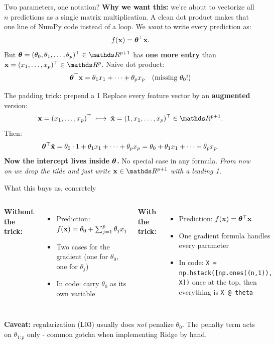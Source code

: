 \documentclass[aspectratio=169]{beamer}
\begin{document}
\begin{frame}{Two parameters, one notation?}
  \textbf{Why we want this:} we're about to vectorize all $n$ predictions as a single matrix multiplication. A clean dot product makes that one line of NumPy code instead of a loop.
  \vfill
  We \emph{want} to write every prediction as:
  \[
    f(\mathbf{x}) = \bm{\theta}^\top \mathbf{x}.
  \]
  But $\thetav = (\theta_0, \theta_1, \dots, \theta_p)^\top \in \R^{p+1}$ has \textbf{one more entry} than $\xv = (x_1, \dots, x_p)^\top \in \R^p$.
  \vfill
  Naive dot product:
  \[
    \bm{\theta}^\top \mathbf{x} = \theta_1 x_1 + \dots + \theta_p x_p \quad \text{(missing $\theta_0$!)}
  \]
\end{frame}

\begin{frame}{The padding trick: prepend a 1}
  Replace every feature vector by an \textbf{augmented} version:
  \[
    \xv = (x_1, \dots, x_p)^\top
    \;\longmapsto\;
    \tilde{\xv} = (1, x_1, \dots, x_p)^\top \in \R^{p+1}.
  \]
  Then:
  \[
    \bm{\theta}^\top \tilde{\mathbf{x}}
    = \theta_0 \cdot 1 + \theta_1 x_1 + \dots + \theta_p x_p
    = \theta_0 + \theta_1 x_1 + \dots + \theta_p x_p.
  \]
  \vfill
  \textbf{Now the intercept lives inside $\bm{\theta}$.} No special case in any formula.
  \vfill
  \emph{From now on we drop the tilde and just write $\xv \in \R^{p+1}$ with a leading 1.}
\end{frame}

\begin{frame}{What this buys us, concretely}
  \begin{columns}[T]
    \textbf{Without the trick:}
    \begin{itemize}\small
      \item Prediction: $f(\mathbf{x}) = \theta_0 + \sum_{j=1}^{p} \theta_j x_j$
      \item Two cases for the gradient (one for $\theta_0$, one for $\theta_j$)
      \item In code: carry $\theta_0$ as its own variable
    \end{itemize}
    \textbf{With the trick:}
    \begin{itemize}\small
      \item Prediction: $f(\mathbf{x}) = \bm{\theta}^\top \mathbf{x}$
      \item One gradient formula handles every parameter
      \item In code: \texttt{X = np.hstack([np.ones((n,1)), X])} once at the top, then everything is \texttt{X @ theta}
    \end{itemize}
  \end{columns}
  \vfill
  \textbf{Caveat:} regularization (L03) usually does \emph{not} penalize $\theta_0$. The penalty term acts on $\theta_{1:p}$ only - common gotcha when implementing Ridge by hand.
\end{frame}
\end{document}
